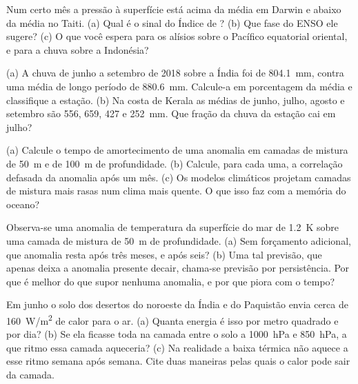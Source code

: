 \begin{exercise}[$\star$]\label{exo:b2:climate-variability:3}
Num certo mês a pressão à superfície está acima da média em Darwin e abaixo da média no Taiti.
(a) Qual é o sinal do Índice de ? (b) Que fase do ENSO ele sugere?
(c) O que você espera para os alísios sobre o Pacífico equatorial oriental, e para a
chuva sobre a Indonésia?
\end{exercise}

\begin{exercise}[$\star$]\label{exo:b2:climate-variability:4}
(a) A chuva de junho a setembro de 2018 sobre a Índia foi de \qty{804.1}{mm}, contra uma
média de longo período de \qty{880.6}{mm}. Calcule-a em porcentagem da média e classifique
a estação. (b) Na costa de Kerala as médias de junho, julho, agosto e setembro são 556,
659, 427 e \qty{252}{mm}. Que fração da chuva da estação cai em julho?
\end{exercise}

\begin{exercise}[$\star\star$]\label{exo:b2:climate-variability:5}
(a) Calcule o tempo de amortecimento de uma anomalia em camadas de mistura de \qty{50}{m} e de \qty{100}{m} de profundidade.
(b) Calcule, para cada uma, a correlação defasada da anomalia após um mês. (c) Os modelos climáticos
projetam camadas de mistura mais rasas num clima mais quente. O que isso faz com a memória do
oceano?
\end{exercise}

\begin{exercise}[$\star\star$]\label{exo:b2:climate-variability:6}
Observa-se uma anomalia de temperatura da superfície do mar de \qty{+1.2}{K} sobre uma camada de mistura de \qty{50}{m}
de profundidade. (a) Sem forçamento adicional, que anomalia resta após três meses, e após seis? (b)
Uma tal previsão, que apenas deixa a anomalia presente decair, chama-se previsão por persistência.
Por que é melhor do que supor nenhuma anomalia, e por que piora com o tempo?
\end{exercise}

\begin{exercise}[$\star\star$]\label{exo:b2:climate-variability:7}
Em junho o solo dos desertos do noroeste da Índia e do Paquistão envia cerca de
\qty{160}{W/m^2} de calor para o ar. (a) Quanta energia é isso por metro quadrado e por dia?
(b) Se ela ficasse toda na camada entre o solo a \qty{1000}{hPa} e \qty{850}{hPa}, a que
ritmo essa camada aqueceria? (c) Na realidade a baixa térmica não aquece a esse ritmo semana após semana.
Cite duas maneiras pelas quais o calor pode sair da camada.
\end{exercise}

